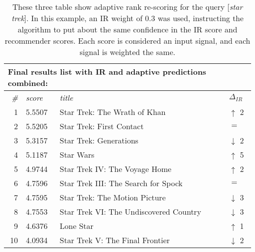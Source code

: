\begin{table}[h]
  \begin{tabular*}{0.9\textwidth}{ r l p{8.5cm} l }
    \multicolumn{4}{l}{Final results list with IR and adaptive predictions combined:}\\
    \toprule
    \emph{\#} & \emph{score} & \emph{title} & $\Delta_{IR}$ \\
    \midrule
    1 & 5.5507  &    Star Trek: The Wrath of Khan            & \color{green} $\uparrow$ 2 \\
    2 & 5.5205  &    Star Trek: First Contact                & \color{black} $=$ \\
    3 & 5.3157  &    Star Trek: Generations                  & \color{red} $\downarrow$ 2 \\
    4 & 5.1187  &    Star Wars                               & \color{green} $\uparrow$ 5 \\
    5 & 4.9744  &    Star Trek IV: The Voyage Home           & \color{green} $\uparrow$ 2 \\
    6 & 4.7596  &    Star Trek III: The Search for Spock     & \color{black} $=$ \\
    7 & 4.7595  &    Star Trek: The Motion Picture           & \color{red} $\downarrow$ 3 \\
    8 & 4.7553  &    Star Trek VI: The Undiscovered Country  & \color{red} $\downarrow$ 3 \\
    9 & 4.6376  &    Lone Star                               & \color{green} $\uparrow$ 1 \\
    10& 4.0934  &    Star Trek V: The Final Frontier         & \color{red} $\downarrow$ 2 \\
    \bottomrule
  \end{tabular*}
  \vspace{1em}
  \caption[Adaptive Rank Re-scoring]{
    These three table show adaptive rank re-scoring for the query [\emph{star trek}].
    In this example, an IR weight of $0.3$ was used, instructing the algorithm to
    put about the same confidence in the IR score and recommender scores.
    Each score is considered an input signal, and each 
    signal is weighted the same.
  }
  \label{table:rank:startrek}
\end{table}

